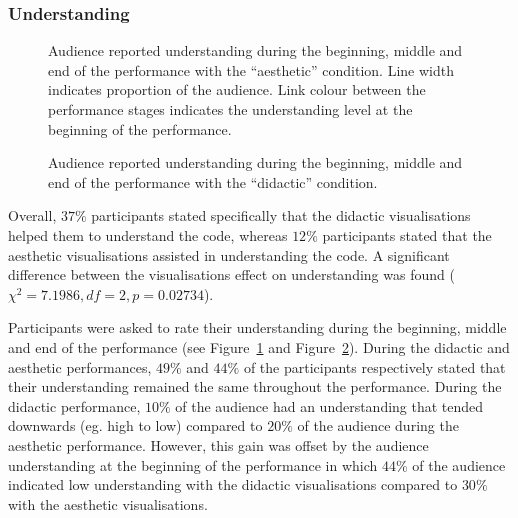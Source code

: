 \documentclass{sig-alternate}
\begin{document}
\subsubsection{Understanding}

\begin{figure}
\centering
{}
\caption{Audience reported understanding during the beginning, middle and end of the performance with the ``aesthetic'' condition. Line width indicates proportion of the audience. Link colour between the performance stages indicates the understanding level at the beginning of the performance.}
\label{fig:aesthetic-understanding}
\end{figure}

\begin{figure}
\centering
{}
\caption{Audience reported understanding during the beginning, middle and end of the performance with the ``didactic'' condition.}
\label{fig:didactic-understanding}
\end{figure}

Overall, $37\%$ participants stated specifically that the didactic visualisations helped them to understand the code, whereas $12\%$ participants stated that the aesthetic visualisations assisted in understanding the code. A significant difference between the visualisations effect on understanding was found ($\chi^2=7.1986,df=2,p=0.02734$).

Participants were asked to rate their understanding during the beginning, middle and end of the performance (see Figure~\ref{fig:aesthetic-understanding} and Figure~\ref{fig:didactic-understanding}). During the didactic and aesthetic performances, $49\%$ and $44\%$ of the participants respectively stated that their understanding remained the same throughout the performance. During the didactic performance, $10\%$ of the audience had an understanding that tended downwards (eg. high to low) compared to $20\%$ of the audience during the aesthetic performance. However, this gain was offset by the audience understanding at the beginning of the performance in which $44\%$ of the audience indicated low understanding with the didactic visualisations compared to $30\%$ with the aesthetic visualisations.

\end{document}

